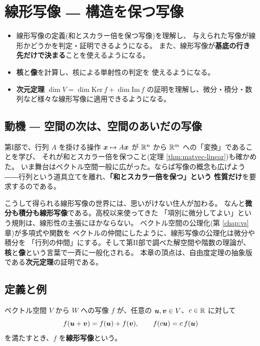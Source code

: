 \chapter{線形写像 ― 構造を保つ写像}\label{chap:linmap}

\begin{goal}
\begin{itemize}
\item 線形写像の定義(和とスカラー倍を保つ写像)を理解し、
与えられた写像が線形かどうかを判定・証明できるようになる。
また、線形写像が\textbf{基底の行き先だけで決まる}ことを使えるようになる。
\item \textbf{核}と\textbf{像}を計算し、核による単射性の判定を
使えるようになる。
\item \textbf{次元定理} $\dim V = \dim \mathrm{Ker}\,f + \dim \mathrm{Im}\,f$
の証明を理解し、微分・積分・数列など様々な線形写像に適用できるようになる。
\end{itemize}
\end{goal}

\section{動機 ― 空間の次は、空間のあいだの写像}

第I部で、行列 $A$ を掛ける操作 $\bm{x} \mapsto A\bm{x}$ が
$\mathbb{R}^n$ から $\mathbb{R}^m$ への「変換」であることを学び、
それが和とスカラー倍を保つこと(定理 \ref{thm:matvec-linear})も確かめた。
いま舞台はベクトル空間一般に広がった。ならば写像の概念も広げよう
――行列という道具立てを離れ、\textbf{「和とスカラー倍を保つ」という
性質だけ}を要求するのである。

こうして得られる線形写像の世界には、思いがけない住人が加わる。
なんと\textbf{微分も積分も線形写像}である。高校以来使ってきた
「項別に微分してよい」という規則は、線形性の主張にほかならない。
ベクトル空間の公理化(第 \ref{chap:vs} 章)が多項式や関数を
ベクトルの仲間にしたように、線形写像の公理化は微分や積分を
「行列の仲間」にする。そして第II部で調べた解空間や階数の理論が、
\textbf{核}と\textbf{像}という言葉で一斉に一般化される。
本章の頂点は、自由度定理の抽象版である\textbf{次元定理}の証明である。

\section{定義と例}

\begin{teigi}[線形写像]
ベクトル空間 $V$ から $W$ への写像 $f$ が、任意の
$\bm{u}, \bm{v} \in V$、$c \in \mathbb{R}$ に対して
\[
f(\bm{u} + \bm{v}) = f(\bm{u}) + f(\bm{v}),
\qquad
f(c\bm{u}) = c\,f(\bm{u})
\]
を満たすとき、$f$ を\textbf{線形写像}という。
\end{teigi}

